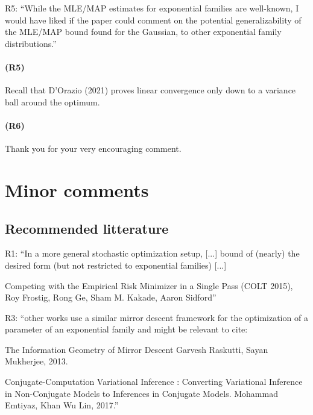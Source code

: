 R5:
``While the MLE/MAP
estimates for exponential families are well-known, I would have liked if the
paper could comment on the potential generalizability of the MLE/MAP bound
found for the Gaussian, to other exponential family distributions.''


\paragraph{(R5)}
Recall that D'Orazio (2021) proves linear convergence only down to a variance ball around the optimum.

\paragraph{(R6)} 
Thank you for your very encouraging comment.

\section*{Minor comments}

\subsection*{Recommended litterature}

R1:
``In a more general stochastic optimization setup, [...]  bound of (nearly) the desired form (but not restricted to exponential families) [...] 

Competing with the Empirical Risk Minimizer in a Single Pass (COLT 2015), Roy Frostig, Rong Ge, Sham M. Kakade, Aaron Sidford''

R3:
``other works use a similar mirror descent framework for the optimization of a parameter of an exponential family and might be relevant to cite:

The Information Geometry of Mirror Descent
Garvesh Raskutti, Sayan Mukherjee, 2013.

Conjugate-Computation Variational Inference : Converting Variational Inference in Non-Conjugate Models to Inferences in Conjugate Models. Mohammad Emtiyaz, Khan Wu Lin, 2017.'' 

